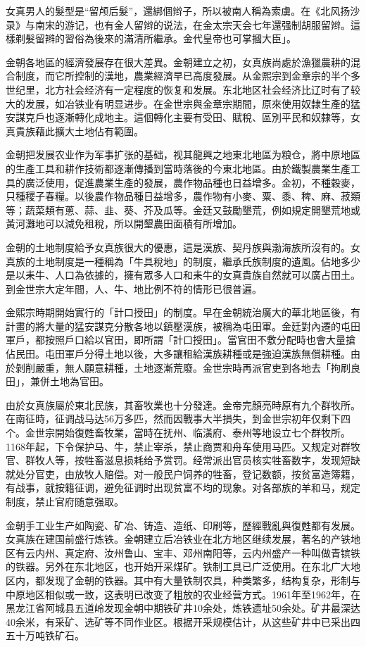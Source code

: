 女真男人的髮型是“留颅后髮”，還綁個辫子，所以被南人稱為索虜。在《北风扬沙录》与南宋的游记，也有金人留辫的说法，在金太宗天会七年還强制胡服留辫。這樣剃髮留辫的習俗為後來的滿清所繼承。金代皇帝也可掌摑大臣」。

金朝各地區的經濟發展存在很大差異。金朝建立之初，女真族尚處於漁獵農耕的混合制度，而它所控制的漢地，農業經濟早已高度發展。从金熙宗到金章宗的半个多世纪里，北方社会经济有一定程度的恢复和发展。东北地区社会经济比辽时有了较大的发展，如冶铁业有明显进步。在金世宗與金章宗期間，原來使用奴隸生產的猛安謀克戶也逐漸轉化成地主。這個轉化主要有受田、賦稅、區別平民和奴隸等，女真貴族藉此擴大土地佔有範圍。

金朝把发展农业作为军事扩张的基础，视其龍興之地東北地區为粮仓，將中原地區的生產工具和耕作技術都逐漸傳播到當時落後的今東北地區。由於鐵製農業生產工具的廣泛使用，促進農業生產的發展，農作物品種也日益增多。金初，不種穀麥，只種稷子春糧。以後農作物品種日益增多，農作物有小麥、粟、黍、稗、麻、菽類等；蔬菜類有蔥、蒜、韭、葵、芥及瓜等。金廷又鼓勵墾荒，例如規定開墾荒地或黃河灘地可以減免租稅，所以開墾農田面積有所增加。

金朝的土地制度給予女真族很大的優惠，這是漢族、契丹族與渤海族所沒有的。女真族的土地制度是一種稱為「牛具稅地」的制度，繼承氏族制度的遺風。佔地多少是以耒牛、人口為依據的，擁有眾多人口和耒牛的女真貴族自然就可以廣占田土。到金世宗大定年間，人、牛、地比例不符的情形已很普遍。

金熙宗時期開始實行的「計口授田」的制度。早在金朝統治廣大的華北地區後，有計畫的將大量的猛安謀克分散各地以鎮壓漢族，被稱為屯田軍。金廷對內遷的屯田軍戶，都按照戶口給以官田，即所謂「計口授田」。當官田不敷分配時也會大量搶佔民田。屯田軍戶分得土地以後，大多讓租給漢族耕種或是強迫漢族無償耕種。由於剝削嚴重，無人願意耕種，土地逐漸荒廢。金世宗時再派官吏到各地去「拘刷良田」，兼併土地為官田。

由於女真族屬於東北民族，其畜牧業也十分發達。金帝完顏亮時原有九个群牧所。在南征時，征调战马达56万多匹，然而因戰事大半損失，到金世宗初年仅剩下四个。金世宗開始復甦畜牧業，當時在抚州、临潢府、泰州等地设立七个群牧所。1168年起，下令保护马、牛，禁止宰杀，禁止商贾和舟车使用马匹。又规定对群牧官、群牧人等，按牲畜滋息损耗给予赏罚。经常派出官员核实牲畜数字，发现短缺就处分官吏，由放牧人赔偿。对一般民户饲养的牲畜，登记数额，按贫富造簿籍，有战事，就按籍征调，避免征调时出现贫富不均的现象。对各部族的羊和马，规定制度，禁止官府随意强取。

金朝手工业生产如陶瓷、矿冶、铸造、造纸、印刷等，歷經戰亂與復甦都有发展。女真族在建国前盛行炼铁。金朝建立后冶铁业在北方地区继续发展，著名的产铁地区有云内州、真定府、汝州鲁山、宝丰、邓州南阳等，云内州盛产一种叫做青镔铁的铁器。另外在东北地区，也开始开采煤矿。铁制工具已广泛使用。在东北广大地区内，都发现了金朝的铁器。其中有大量铁制农具，种类繁多，结构复杂，形制与中原地区相似或一致，这表明已改变了粗放的农业经营方式。1961年至1962年，在黑龙江省阿城县五道岭发现金朝中期铁矿井10余处，炼铁遗址50余处。矿井最深达40余米，有采矿、选矿等不同作业区。根据开采规模估计，从这些矿井中已采出四五十万吨铁矿石。

